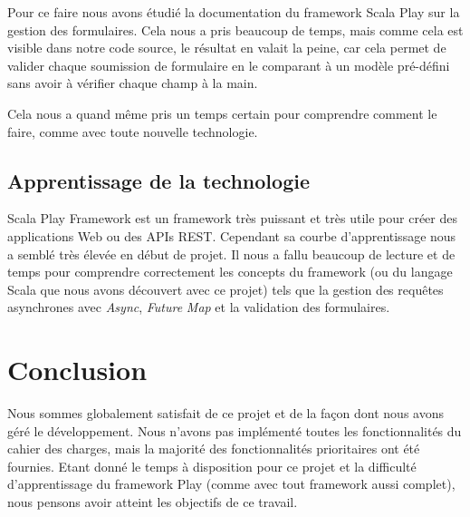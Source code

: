 \documentclass[11pt, a4paper, french, twoside]{article}
\begin{document}
			Pour ce faire nous avons étudié la documentation du framework Scala Play sur la gestion des formulaires. Cela nous a pris beaucoup de temps, mais comme cela est visible dans notre code source, le résultat en valait la peine, car cela permet de valider chaque soumission de formulaire en le comparant à un modèle pré-défini sans avoir à vérifier chaque champ à la main. 
			
			Cela nous a quand même pris un temps certain pour comprendre comment le faire, comme avec toute nouvelle technologie.
			
		\subsection{Apprentissage de la technologie}
			Scala Play Framework est un framework très puissant et très utile pour créer des applications Web ou des APIs REST. Cependant sa courbe d'apprentissage nous a semblé très élevée en début de projet. Il nous a fallu beaucoup de lecture et de temps pour comprendre correctement les concepts du framework (ou du langage Scala que nous avons découvert avec ce projet) tels que la gestion des requêtes asynchrones avec \textit{Async}, \textit{Future} \textit{Map} et la validation des formulaires.
			
	\section{Conclusion}
		Nous sommes globalement satisfait de ce projet et de la façon dont nous avons géré le développement. Nous n'avons pas implémenté toutes les fonctionnalités du cahier des charges, mais la majorité des fonctionnalités prioritaires ont été fournies. Etant donné le temps à disposition pour ce projet et la difficulté d'apprentissage du framework Play (comme avec tout framework aussi complet), nous pensons avoir atteint les objectifs de ce travail. 
		
\end{document}
